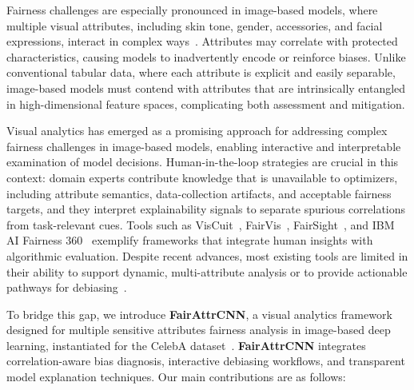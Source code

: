 \documentclass[sigconf]{acmart}
\newcommand{\REVISE}[1]{#1}
\begin{document}
Fairness challenges are especially pronounced in image-based models, where multiple visual attributes, including skin tone, gender, accessories, and facial expressions, interact in complex ways~\cite{DBLP:journals/csur/ParragaMOGKMMSB25, torfason2017face}. Attributes may correlate with protected characteristics, causing models to inadvertently encode or reinforce biases. Unlike conventional tabular data, where each attribute is explicit and easily separable, image-based models must contend with attributes that are intrinsically entangled in high-dimensional feature spaces, complicating both assessment and mitigation.


\REVISE{Visual analytics has emerged as a promising approach for addressing complex fairness challenges in image-based models, enabling interactive and interpretable examination of model decisions. Human-in-the-loop strategies are crucial in this context: domain experts contribute knowledge that is unavailable to optimizers, including attribute semantics, data-collection artifacts, and acceptable fairness targets, and they interpret explainability signals to separate spurious correlations from task-relevant cues. Tools such as VisCuit~\cite{DBLP:conf/cvpr/0007HWC22}, FairVis~\cite{DBLP:conf/ieeevast/CabreraEHKMC19}, FairSight~\cite{DBLP:journals/tvcg/AhnL20}, and IBM AI Fairness 360~\cite{IBMbellamy2019aif360} exemplify frameworks that integrate human insights with algorithmic evaluation. Despite recent advances, most existing tools are limited in their ability to support dynamic, multi-attribute analysis or to provide actionable pathways for debiasing~\cite{DBLP:conf/icde/CachelRH22, DBLP:conf/cvpr/RamaswamyKR21, hu2024enhancing}. }


To bridge this gap, we introduce \textbf{FairAttrCNN}, a visual analytics framework designed for multiple sensitive attributes fairness analysis in image-based deep learning, instantiated for the CelebA dataset~\cite{DBLP:conf/iccv/LiuLWT15}. \textbf{FairAttrCNN} integrates correlation-aware bias diagnosis, interactive debiasing workflows, and transparent model explanation techniques. Our main contributions are as follows:
\end{document}
